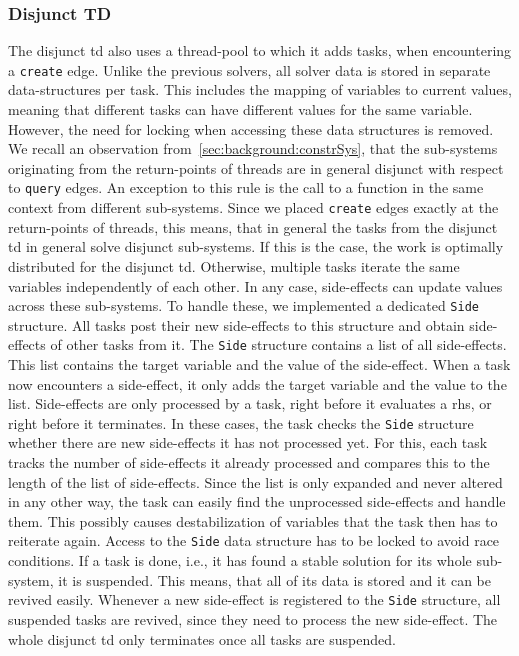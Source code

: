     \subsubsection{Disjunct TD}
    \label{sec:method:td_parallel:disjunct}
    The disjunct \ac{td} also uses a thread-pool to which it adds tasks, when encountering a \texttt{create} edge. Unlike the previous solvers, all solver data is stored in separate data-structures per task. This includes the mapping of variables to current values, meaning that different tasks can have different values for the same variable. However, the need for locking when accessing these data structures is removed. We recall an observation from~\autoref{sec:background:constrSys}, that the sub-systems originating from the return-points of threads are in general disjunct with respect to \texttt{query} edges. An exception to this rule is the call to a function in the same context from different sub-systems. Since we placed \texttt{create} edges exactly at the return-points of threads, this means, that in general the tasks from the disjunct \ac{td} in general solve disjunct sub-systems. If this is the case, the work is optimally distributed for the disjunct \ac{td}. Otherwise, multiple tasks iterate the same variables independently of each other.
    In any case, side-effects can update values across these sub-systems. To handle these, we implemented a dedicated \texttt{Side} structure. All tasks post their new side-effects to this structure and obtain side-effects of other tasks from it. The \texttt{Side} structure contains a list of all side-effects. This list contains the target variable and the value of the side-effect. When a task now encounters a side-effect, it only adds the target variable and the value to the list. Side-effects are only processed by a task, right before it evaluates a \ac{rhs}, or right before it terminates. In these cases, the task checks the \texttt{Side} structure whether there are new side-effects it has not processed yet. For this, each task tracks the number of side-effects it already processed and compares this to the length of the list of side-effects. Since the list is only expanded and never altered in any other way, the task can easily find the unprocessed side-effects and handle them. This possibly causes destabilization of variables that the task then has to reiterate again. Access to the \texttt{Side} data structure has to be locked to avoid race conditions.
    If a task is done, i.e., it has found a stable solution for its whole sub-system, it is suspended. This means, that all of its data is stored and it can be revived easily. Whenever a new side-effect is registered to the \texttt{Side} structure, all suspended tasks are revived, since they need to process the new side-effect. The whole disjunct \ac{td} only terminates once all tasks are suspended.
